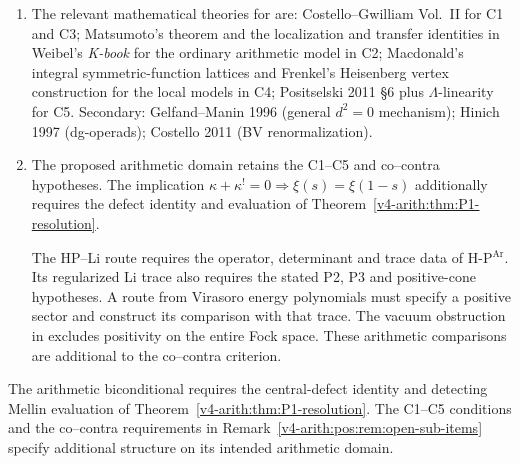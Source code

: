 \begin{enumerate}
\item The relevant mathematical theories for
 are: Costello--Gwilliam
Vol.~II for C1 and C3; Matsumoto's theorem and the localization
and transfer identities in Weibel's \emph{K-book} for the ordinary
arithmetic model in C2;
Macdonald's integral symmetric-function lattices and Frenkel's
Heisenberg vertex construction for the local models in C4;
Positselski 2011 \S6 plus \(\Lambda\)-linearity for C5.
Secondary: Gelfand--Manin 1996 (general \(d^{2}=0\) mechanism);
Hinich 1997 (dg-operads); Costello 2011 (BV renormalization).

\item The proposed arithmetic domain retains the C1--C5 and
co--contra hypotheses. The implication
\(\kappa+\kappa^!=0\Rightarrow\xi(s)=\xi(1-s)\) additionally
requires the defect identity and evaluation of
Theorem~\ref{v4-arith:thm:P1-resolution}.

The HP--Li route requires the operator, determinant and trace
data of H-P\({}^{\mathrm{Ar}}\). Its regularized Li trace also
requires the stated P2, P3 and positive-cone hypotheses.
A route from Virasoro energy polynomials must specify a positive
sector and construct its comparison with that trace.
The vacuum obstruction in 
excludes positivity on the entire Fock space.
These arithmetic comparisons are additional to the co--contra
criterion.
\end{enumerate}

The arithmetic biconditional requires the central-defect identity
and detecting Mellin evaluation of
Theorem~\ref{v4-arith:thm:P1-resolution}.
The C1--C5 conditions and the co--contra requirements in
Remark~\ref{v4-arith:pos:rem:open-sub-items} specify additional
structure on its intended arithmetic domain.
